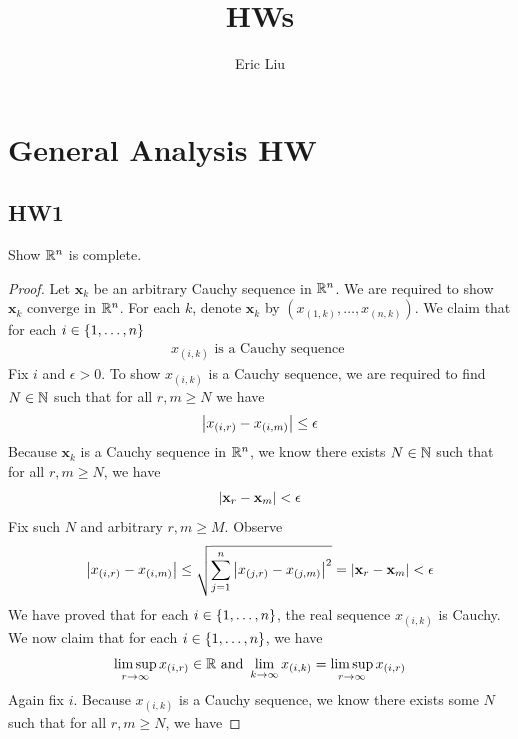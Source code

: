 \documentclass{report}
\title{\Huge{HWs}}
\author{\huge{Eric Liu}}
\date{}
\begin{document}
\maketitle
\newpage%
\tableofcontents
\pagebreak

\chapter{General Analysis HW}
\section{HW1}
\begin{question}{}{}
Show $\mathbb{R}^n$ is complete.
\end{question}
\begin{proof}
Let $\textbf{x}_k$ be an arbitrary Cauchy sequence in $\mathbb{R}^n$. We are required to show  $\textbf{x}_k$ converge in $\mathbb{R}^n$. For each $k$, denote  $\textbf{x}_k$ by $(x_{(1,k)},\dots ,x_{(n,k)})$. We claim that for each $i \in \{ 1,\dots ,n \}$
\begin{align*}
x_{(i,k)}\text{ is a Cauchy sequence }
\end{align*}
Fix $i$ and $\epsilon >0$. To show $x_{(i,k)}$ is a Cauchy sequence, we are required to find $N\in\mathbb{N}$ such that for all $r,m\geq N$ we have 
\begin{align*}
\left|x_{(i,r)}-x_{(i,m)}\right|\leq \epsilon 
\end{align*}
Because $\textbf{x}_k$ is a Cauchy sequence in $\mathbb{R}^n$, we know there exists  $N\in\mathbb{N}$ such that for all $r,m\geq N$, we have 
\begin{align*}
\left|\textbf{x}_r-\textbf{x}_m\right|< \epsilon 
\end{align*}
Fix such $N$ and arbitrary $r,m\geq M$. Observe 
\begin{align*}
\left|x_{(i,r)}-x_{(i,m)}\right|\leq \sqrt{\sum_{j=1}^n \left|x_{(j,r)}-x_{(j,m)}\right|^2}= \left|\textbf{x}_r - \textbf{x}_m\right|< \epsilon 
\end{align*}
We have proved that for each $i\in \{ 1,\dots ,n \}$, the real sequence $x_{(i,k)}$ is Cauchy. We now claim that for each $i \in \{ 1,\dots, n \}$, we have 
\begin{align*}
  \limsup_{r\to\infty} x_{(i,r)}\in\mathbb{R} \text{ and }\lim_{k\to \infty}x_{(i,k)}= \limsup_{r\to\infty} x_{(i,r)}
\end{align*}
Again fix $i$. Because $x_{(i,k)}$ is a Cauchy sequence, we know there exists some $N$ such that for all $r,m\geq N$, we have 

\end{proof}
\end{document}
